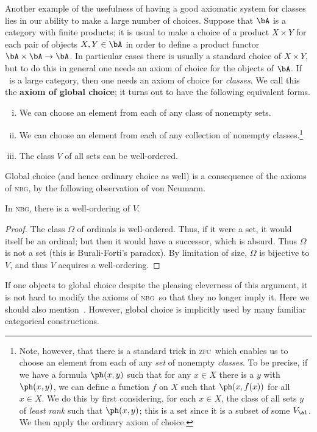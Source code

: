 \documentclass{amsart}
\def\zfc{\textsc{zfc}}
\def\nbg{\textsc{nbg}}
\begin{document}
Another example of the usefulness of having a good axiomatic system
for classes lies in our ability to make a large number of choices.
Suppose that $\bA$ is a category with finite products; it is usual to
make a choice of a product $X\times Y$ for each pair of objects
$X,Y\in \bA$ in order to define a product functor
$\bA\times\bA\to\bA$.  In particular cases there is usually a standard
choice of $X\times Y$, but to do this in general one needs an axiom of
choice for the objects of $\bA$.  If \bA\ is a large category, then
one needs an axiom of choice for \emph{classes}.  We call this the
\textbf{axiom of global choice}; it turns out to have the following
equivalent forms.
\begin{enumerate}[(i)]
\item We can choose an element from each of any class of
  nonempty sets.\label{item:gc1}
\item We can choose an element from each of any collection of nonempty
  classes.\label{item:gc2}\footnote{Note, however, that there is a
    standard trick in \zfc\ which enables us to choose an element from
    each of any \emph{set} of nonempty \emph{classes}.  To be precise,
    if we have a formula $\ph(x,y)$ such that for any $x\in X$ there
    is a $y$ with $\ph(x,y)$, we can define a function $f$ on $X$ such
    that $\ph(x,f(x))$ for all $x\in X$.  We do this by first
    considering, for each $x\in X$, the class of all sets $y$ of
    \emph{least rank} such that $\ph(x,y)$; this is a set since it is
    a subset of some $V_\al$.  We then apply the ordinary axiom of
    choice.}
\item The class $V$ of all sets can be well-ordered.\label{item:gc3}
\end{enumerate}
Global choice (and hence ordinary choice as well) is a consequence of
the axioms of \nbg, by the following observation of von Neumann.

\begin{thm}\label{thm:global-choice}
  In \nbg, there is a well-ordering of $V$.
\end{thm}
\begin{proof}
  The class $\Omega$ of ordinals is well-ordered.  Thus, if it
  were a set, it would itself be an ordinal; but then it would have a
  successor, which is absurd.  Thus $\Omega$ is not a set (this
  is Burali-Forti's paradox).  By limitation of size, $\Omega$
  is bijective to $V$, and thus $V$ acquires a well-ordering.
\end{proof}

If one objects to global choice despite the pleasing cleverness of
this argument, it is not hard to modify the axioms of \nbg\ so that they
no longer imply it.  Here we should also
mention~\cite{makkai:avoiding-choice}.  However, global choice is
implicitly used by many familiar categorical constructions.
\end{document}
